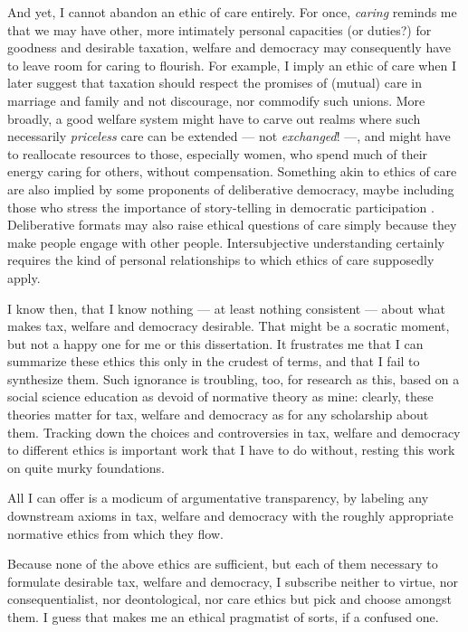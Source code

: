 \begin{description}
	And yet, I cannot abandon an ethic of care entirely. 
	For once, \emph{caring} reminds me that we may have other, more intimately personal capacities (or duties?) for goodness and desirable taxation, welfare and democracy may consequently have to leave room for caring to flourish. 
	For example, I imply an ethic of care when I later suggest that taxation should respect the promises of (mutual) care in marriage and family and not discourage, nor commodify such unions. %
	More broadly, a good welfare system might have to carve out realms where such necessarily \emph{priceless} care can be extended --- not \emph{exchanged}! ---, and might have to reallocate resources to those, especially women, who spend much of their energy caring for others, without compensation. 
	Something akin to ethics of care are also implied by some proponents of deliberative democracy, maybe including those who stress the importance of story-telling in democratic participation \citep{Poletta2006}. 
	Deliberative formats may also raise ethical questions of care simply because they make people engage with other people. Intersubjective understanding certainly requires the kind of personal relationships to which ethics of care supposedly apply.
\end{description}

I know then, that I know nothing --- at least nothing consistent --- about what makes tax, welfare and democracy desirable. 
That might be a socratic moment, but not a happy one for me or this dissertation. 
It frustrates me that I can summarize these ethics this only in the crudest of terms, and that I fail to synthesize them. 
Such ignorance is troubling, too, for research as this, based on a social science education as devoid of normative theory as mine: clearly, these theories matter for tax, welfare and democracy as for any scholarship about them. 
Tracking down the choices and controversies in tax, welfare and democracy to different ethics is important work that I have to do without, resting this work on quite murky foundations.

All I can offer is a modicum of argumentative transparency, by labeling any downstream axioms in tax, welfare and democracy with the roughly appropriate normative ethics from which they flow.

Because none of the above ethics are sufficient, but each of them necessary to formulate desirable tax, welfare and democracy, I subscribe neither to virtue, nor consequentialist, nor deontological, nor care ethics but pick and choose amongst them.
I guess that makes me an ethical pragmatist of sorts, if a confused one.


